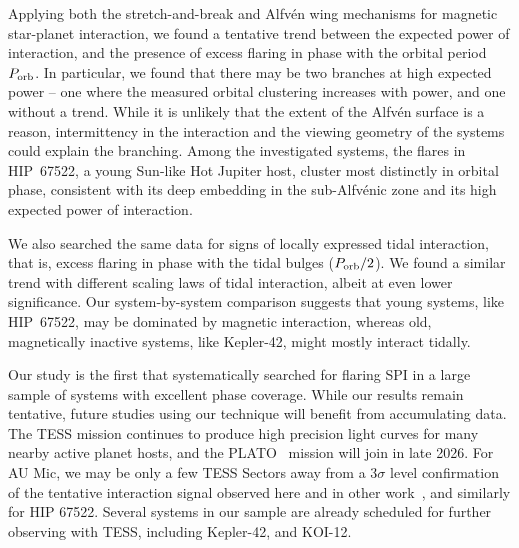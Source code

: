 \documentclass[twocolumn]{aastex631}
\begin{document}
Applying both the stretch-and-break and Alfv\'en wing mechanisms for magnetic star-planet interaction, we found a tentative trend between the expected power of interaction, and the presence of excess flaring in phase with the orbital period $P_{\rm orb}$. In particular, we found that there may be two branches at high expected power -- one where the measured orbital clustering increases with power, and one without a trend. While it is unlikely that the extent of the Alfv\'en surface is a reason, intermittency in the interaction and the viewing geometry of the systems could explain the branching. Among the investigated systems, the flares in HIP~67522, a young Sun-like Hot Jupiter host, cluster most distinctly in orbital phase, consistent with its deep embedding in the sub-Alfv\'enic zone and its high expected power of interaction.

We also searched the same data for signs of locally expressed tidal interaction, that is, excess flaring in phase with the tidal bulges ($P_{\rm orb}/2$). We found a similar trend with different scaling laws of tidal interaction, albeit at even lower significance. Our system-by-system comparison suggests that young systems, like HIP~67522, may be dominated by magnetic interaction, whereas old, magnetically inactive systems, like Kepler-42, might mostly interact tidally. 

Our study is the first that systematically searched for flaring SPI in a large sample of systems with excellent phase coverage. While our results remain tentative, future studies using our technique will benefit from accumulating data. The TESS mission continues to produce high precision light curves for many nearby active planet hosts, and the PLATO~\citep{rauer2014plato} mission will join in late 2026. For AU Mic, we may be only a few TESS Sectors away from a $3\sigma$ level confirmation~\citep{ilin2022searching} of the tentative interaction signal observed here and in other work~\citep{klein2022one}, and similarly for HIP 67522. Several systems in our sample are already scheduled for further observing with TESS, including Kepler-42, and KOI-12.

 

\end{document}
